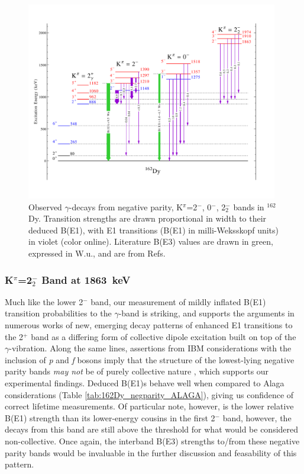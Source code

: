 \begin{figure}[h]
\begin{center}
\includegraphics[width=0.98\textwidth]{figures/162Dy_negparity_202.pdf}
\caption{Observed $\gamma$-decays from negative parity, K$^\pi$=2$^-$, 0$^-$, 2$^-_2$ bands in $^{162}$Dy. Transition strengths are drawn proportional in width to their deduced B(E1), with E1 transitions (B(E1) in milli-Weksskopf units) in violet (color online). Literature B(E3) values are drawn in green, expressed in W.u., and are from Refs. \cite{McGowan_BE2_1981,OEHLBERG_BE3} \label{fig:162Dy_negparity_202}}
\end{center}
\end{figure}

\subsubsection{K$^\pi$=2$^-_2$ Band at 1863~keV}

Much like the lower 2$^-$ band, our measurement of mildly inflated B(E1) transition probabilities to the $\gamma$-band is striking, and supports the arguments in numerous works of new, emerging decay patterns \cite{Pascu_octupole_2015,Chakraborty_negparity2012,Spiecker_E1strength} of enhanced E1 transitions to the 2$^+$ band as a differing form of collective dipole excitation built on top of the $\gamma$-vibration. Along the same lines, assertions from IBM considerations with the inclusion of \textit{p} and \textit{f} bosons imply that the structure of the lowest-lying negative parity bands \textit{may not} be of purely collective nature  \cite{Aprahamian200642, Iachello_Arima_IBM}, which supports our experimental findings. Deduced B(E1)s behave well when compared to Alaga considerations (Table \ref{tab:162Dy_negparity_ALAGA}), giving us confidence of correct lifetime measurements. Of particular note, however, is the lower relative B(E1) strength than its lower-energy cousins in the first 2$^-$ band, however, the decays from this band are still above the threshold for what would be considered non-collective. Once again, the interband B(E3) strengths to/from these negative parity bands would be invaluable in the further discussion and feasability of this pattern.

